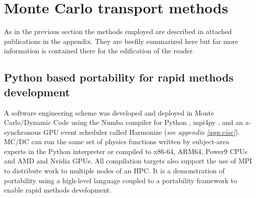 


\section{Monte Carlo transport methods}
As in the previous section the methods employed are described in attached publications in the appendix.
They are beefily summarized here but far more information is contained there for the edification of the reader.

%   
\subsection{Python based portability for rapid methods development}

A software engineering scheme was developed and deployed in Monte Carlo/Dynamic Code \cite{morgan_monte_2024} using the Numba compiler for Python \cite{lam_numba_2015}, mpi4py \cite{mpi4py_2021}, and an a-synchronous GPU event scheduler called Harmonize \cite{brax2023} (\textit{see appendix \ref{app:cise}}).
MC/DC can run the same set of physics functions written by subject-area experts in the Python interpreter or compiled to x86-64, ARM64, Power9 CPUs and AMD and Nvidia GPUs.
All compilation targets also support the use of MPI to distribute work to multiple nodes of an HPC.
It is a demonstration of portability using a high-level language coupled to a portability framework to enable rapid methods development.


